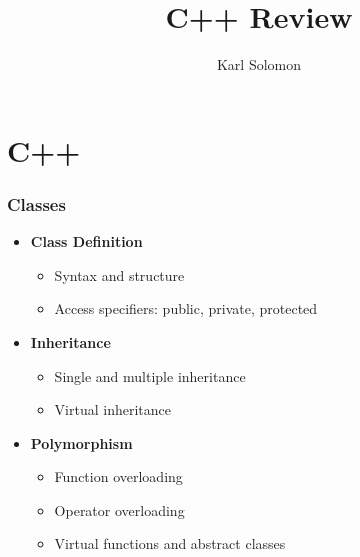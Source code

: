 \documentclass{article}
\begin{document}
\selectfont
\title{C++ Review}
\author{Karl Solomon}
\maketitle
\tableofcontents
\part{C++}
\section{Classes}
    \begin{itemize}
      \item \textbf{Class Definition}
        \begin{itemize}
          \item Syntax and structure
          \item Access specifiers: public, private, protected
        \end{itemize}
      \item \textbf{Inheritance}
        \begin{itemize}
          \item Single and multiple inheritance
          \item Virtual inheritance
        \end{itemize}
      \item \textbf{Polymorphism}
        \begin{itemize}
          \item Function overloading
          \item Operator overloading
          \item Virtual functions and abstract classes
        \end{itemize}
    \end{itemize}
\end{document}
